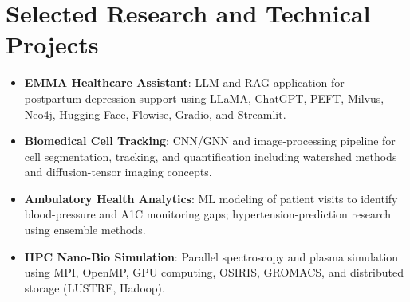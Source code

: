 \documentclass[11pt,a4paper,sans]{moderncv}
\begin{document}

\section{Selected Research and Technical Projects}
\vspace{1pt}
\begin{itemize}
\item \textbf{EMMA Healthcare Assistant}: LLM and RAG application for postpartum-depression support using LLaMA, ChatGPT, PEFT, Milvus, Neo4j, Hugging Face, Flowise, Gradio, and Streamlit.
\item \textbf{Biomedical Cell Tracking}: CNN/GNN and image-processing pipeline for cell segmentation, tracking, and quantification including watershed methods and diffusion-tensor imaging concepts.
\item \textbf{Ambulatory Health Analytics}: ML modeling of patient visits to identify blood-pressure and A1C monitoring gaps; hypertension-prediction research using ensemble methods.
\item \textbf{HPC Nano-Bio Simulation}: Parallel spectroscopy and plasma simulation using MPI, OpenMP, GPU computing, OSIRIS, GROMACS, and distributed storage (LUSTRE, Hadoop).
\end{itemize}

\end{document}
